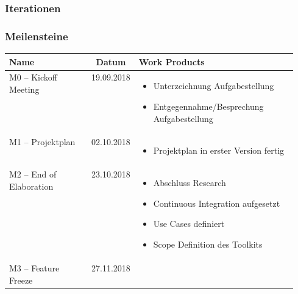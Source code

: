 \subsubsection{Iterationen}

\clearpage

\subsubsection{Meilensteine}
\begin{table}[H]
    \centering
    \def\arraystretch{2}
    \begin{tabular}{|l|c|p{0.55\linewidth}|} \hline
        \textbf{Name} & \textbf{Datum} & \textbf{Work Products} \\ \hline
        M0 – Kickoff Meeting & 19.09.2018 &
        \vspace{-7mm}
        \begin{itemize}
            \setlength\itemsep{0mm}
            \item Unterzeichnung Aufgabestellung
            \item Entgegennahme/Besprechung Aufgabestellung
            \vspace{-\topsep}
        \end{itemize} \\ \hline
        M1 – Projektplan & 02.10.2018 &
        \vspace{-7mm}
        \begin{itemize}
            \setlength\itemsep{0mm}
            \item Projektplan in erster Version fertig
            \vspace{-\topsep}
        \end{itemize} \\ \hline
        M2 – End of Elaboration & 23.10.2018 &
        \vspace{-7mm}
        \begin{itemize}
            \setlength\itemsep{0mm}
            \item Abschluss Research
            \item Continuous Integration aufgesetzt
            \item Use Cases definiert
            \item Scope Definition des Toolkits
            \vspace{-\topsep}
        \end{itemize} \\ \hline
        M3 – Feature Freeze & 27.11.2018 &
        \vspace{-7mm}

\end{tabular}
\end{table}
